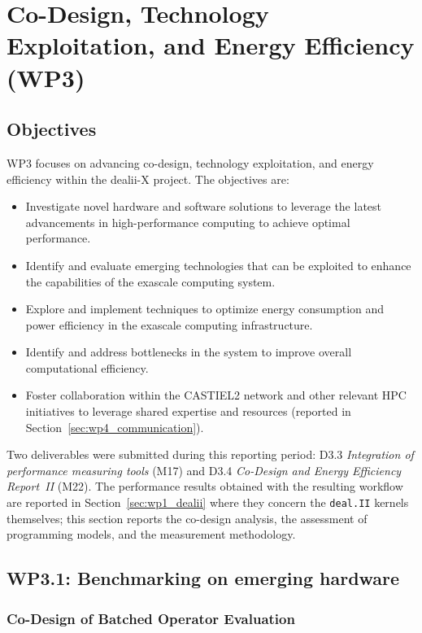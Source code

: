 \documentclass[a4paper,12pt, numbers]{article}
\newcommand{\dealii}{\texttt{deal.II}}
\begin{document}
\newpage

\section{{Co-Design, Technology Exploitation, and Energy Efficiency (WP3)}}
\label{sec:wp3_codesign}

\subsection{Objectives}

WP3 focuses on advancing co-design, technology exploitation, and energy efficiency within the dealii-X project. The objectives are:
\begin{itemize}[left=1em, itemsep=0pt, topsep=0pt]
	\item Investigate novel hardware and software solutions to leverage the latest advancements in high-performance computing to achieve optimal performance.
	\item Identify and evaluate emerging technologies that can be exploited to enhance the capabilities of the exascale computing system.
	\item Explore and implement techniques to optimize energy consumption and power efficiency in the exascale computing infrastructure.
	\item Identify and address bottlenecks in the system to improve overall computational efficiency.
	\item Foster collaboration within the CASTIEL2 network and other relevant HPC initiatives to leverage shared expertise and resources (reported in Section~\ref{sec:wp4_communication}).
\end{itemize}

Two deliverables were submitted during this reporting period: D3.3 \emph{Integration of performance measuring tools} (M17) and D3.4 \emph{Co-Design and Energy Efficiency Report~II} (M22). The performance results obtained with the resulting workflow are reported in Section~\ref{sec:wp1_dealii} where they concern the \dealii{} kernels themselves; this section reports the co-design analysis, the assessment of programming models, and the measurement methodology.


\subsection{WP3.1: Benchmarking on emerging hardware}

\subsubsection*{Co-Design of Batched Operator Evaluation}
\end{document}
